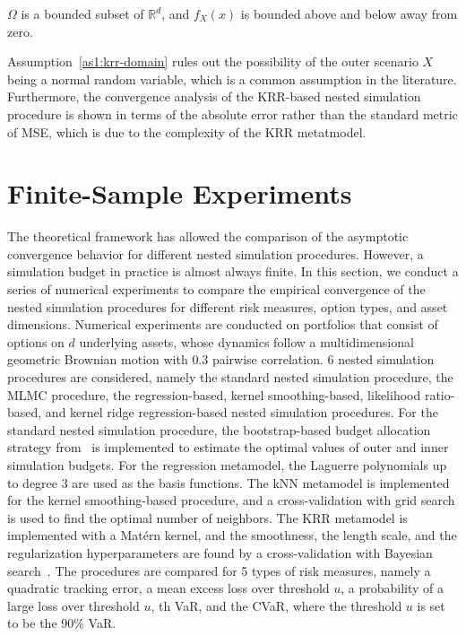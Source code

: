 \begin{assumption} \label{as1:krr-domain}
    $\Omega$ is a bounded subset of $\mathbb{R}^d$, and $f_X(x)$ is bounded above and below away from zero.
\end{assumption}

Assumption~\ref{as1:krr-domain} rules out the possibility of the outer scenario $X$ being a normal random variable, which is a common assumption in the literature.
Furthermore, the convergence analysis of the KRR-based nested simulation procedure is shown in terms of the absolute error rather than the standard metric of MSE, which is due to the complexity of the KRR metatmodel.

\section{Finite-Sample Experiments} \label{sec1:numerical-experiments}
The theoretical framework has allowed the comparison of the asymptotic convergence behavior for different nested simulation procedures.
However, a simulation budget in practice is almost always finite.
In this section, we conduct a series of numerical experiments to compare the empirical convergence of the nested simulation procedures for different risk measures, option types, and asset dimensions.
Numerical experiments are conducted on portfolios that consist of options on $d$ underlying assets, whose dynamics follow a multidimensional geometric Brownian motion with $0.3$ pairwise correlation.
6 nested simulation procedures are considered, namely the standard nested simulation procedure, the MLMC procedure, the regression-based, kernel smoothing-based, likelihood ratio-based, and kernel ridge regression-based nested simulation procedures.
For the standard nested simulation procedure, the bootstrap-based budget allocation strategy from~\cite{zhang2021bootstrap} is implemented to estimate the optimal values of outer and inner simulation budgets.
For the regression metamodel, the Laguerre polynomials up to degree $3$ are used as the basis functions.
The kNN metamodel is implemented for the kernel smoothing-based procedure, and a cross-validation with grid search is used to find the optimal number of neighbors.
The KRR metamodel is implemented with a Mat\'ern kernel, and the smoothness, the length scale, and the regularization hyperparameters are found by a cross-validation with Bayesian search~\citep{frazier2018bayesian}.
The procedures are compared for 5 types of risk measures, namely a quadratic tracking error, a mean excess loss over threshold $u$, a probability of a large loss over threshold $u$, th VaR, and the CVaR, where the threshold $u$ is set to be the 90\% VaR.
